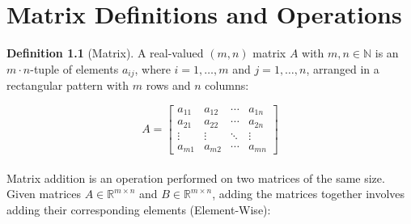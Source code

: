 \documentclass{report}
\begin{document}
\tableofcontents
\clearpage







\section{Matrix Definitions and Operations}
\noindent \textbf{Definition 1.1} (Matrix).
A real-valued $(m, n)$ matrix $A$ with $m, n \in \mathbb{N}$ is an $m \cdot n$-tuple of elements $a_{ij}$, where $i = 1, \ldots, m$ and $j = 1, \ldots, n$, arranged in a rectangular pattern with $m$ rows and $n$ columns:

\[ A = \begin{bmatrix} 
a_{11} & a_{12} & \cdots & a_{1n} \\
a_{21} & a_{22} & \cdots & a_{2n} \\
\vdots & \vdots & \ddots & \vdots \\
a_{m1} & a_{m2} & \cdots & a_{mn} 
\end{bmatrix} \]
\\
\noindent
Matrix addition is an operation performed on two matrices of the same size. Given matrices $A \in \mathbb{R}^{m\times n}$ and $B \in \mathbb{R}^{m\times n}$, adding the matrices together involves adding their corresponding elements (Element-Wise):
\end{document}
